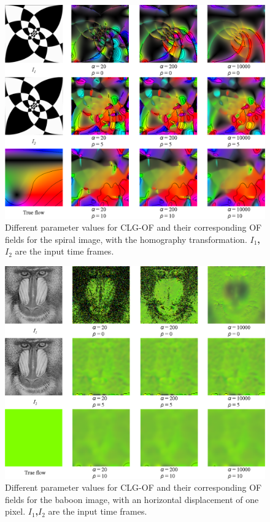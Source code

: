 \documentclass{article}
\begin{document}
\begin{figure}
 \centering
 \includegraphics[width=1.00\textwidth]{./img/ex_spiral_hom.png}
 \caption{Different parameter values for CLG-OF and their corresponding OF fields 
          for the spiral image, with the homography transformation.
          \textbf{$I_1$,$I_2$} are the input time frames.}
 \label{fig:ex3}
\end{figure}


\begin{figure}
 \centering
 \includegraphics[width=1.00\textwidth]{./img/ex_baboon_one.png}
 \caption{Different parameter values for CLG-OF and their corresponding OF fields 
          for the baboon image, with an horizontal displacement of one pixel.
          \textbf{$I_1$,$I_2$} are the input time frames.}
 \label{fig:ex4}
\end{figure}
\end{document}
